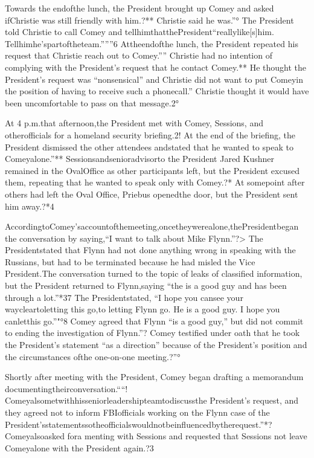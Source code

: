 Towards the endofthe lunch, the President brought up Comey and asked ifChristie was still friendly with him.?** Christie said he was.”° The President told Christie to call Comey and tellhimthatthePresident“reallylike[s]him. Tellhimhe’spartoftheteam.”””6 Attheendofthe lunch, the President repeated his request that Christie reach out to Comey.”” Christie had no intention of complying with the President’s request that he contact Comey.** He thought the President’s request was “nonsensical” and Christie did not want to put Comeyin the position of having to receive such a phonecall.” Christie thought it would have been uncomfortable to pass on that message.2°

At 4 p.m.that afternoon,the President met with Comey, Sessions, and otherofficials for a homeland security briefing.2! At the end of the briefing, the President dismissed the other attendees andstated that he wanted to speak to Comeyalone.”** Sessionsandsenioradvisorto the President Jared Kushner remained in the OvalOffice as other participants left, but the President excused them, repeating that he wanted to speak only with Comey.?* At somepoint after others had left the Oval Office, Priebus openedthe door, but the President sent him away.?*4

AccordingtoComey’saccountofthemeeting,oncetheywerealone,thePresidentbegan the conversation by saying,“I want to talk about Mike Flynn.”?> The Presidentstated that Flynn had not done anything wrong in speaking with the Russians, but had to be terminated because he had misled the Vice President.The conversation turned to the topic of leaks of classified information, but the President returned to Flynn,saying “the is a good guy and has been through a
lot.”*37 The Presidentstated, “I hope you cansee your waycleartoletting this go,to letting Flynn go. He is a good guy. I hope you canletthis go.”"°8 Comey agreed that Flynn “is a good guy,” but did not commit to ending the investigation of Flynn.”? Comey testified under oath that he took the President’s statement “as a direction” because of the President’s position and the circumstances ofthe one-on-one meeting.?”°

Shortly after meeting with the President, Comey began drafting a memorandum documentingtheirconversation.““! Comeyalsometwithhisseniorleadershipteamtodiscussthe President’s request, and they agreed not to inform FBIofficials working on the Flynn case of the President’sstatementssotheofficialswouldnotbeinfluencedbytherequest.”*? Comeyalsoasked fora menting with Sessions and requested that Sessions not leave Comeyalone with the President again.?3

